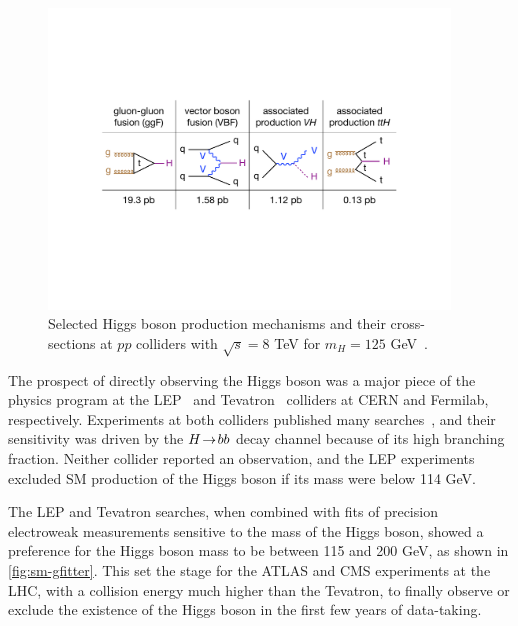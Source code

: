 \begin{figure}[tp]
  \centering
  \includegraphics[width=0.95\textwidth]{figures/standardmodel/higgsproductions}
  \caption{Selected Higgs boson production mechanisms and their cross-sections at $pp$ colliders with $\sqrt{s} = 8$ TeV for $m_H \!=\! 125$ GeV~\cite{2013.lhchxswg}.}
  \label{fig:sm-higgs-diagrams}
\end{figure}

The prospect of directly observing the Higgs boson was a major piece of the physics program at the LEP~\cite{1996.cern-press} and Tevatron~\cite{2001.fermilab-press} colliders at CERN and Fermilab, respectively. Experiments at both colliders published many searches~\cite{2003.lep-higgs,2013.tevatron-higgs}, and their sensitivity was driven by the $H \!\rightarrow\! bb$ decay channel because of its high branching fraction. Neither collider reported an observation, and the LEP experiments excluded SM production of the Higgs boson if its mass were below 114 GeV.

The LEP and Tevatron searches, when combined with fits of precision electroweak measurements sensitive to the mass of the Higgs boson, showed a preference for the Higgs boson mass to be between 115 and 200 GeV, as shown in \cref{fig:sm-gfitter}. This set the stage for the ATLAS and CMS experiments at the LHC, with a collision energy much higher than the Tevatron, to finally observe or exclude the existence of the Higgs boson in the first few years of data-taking.

